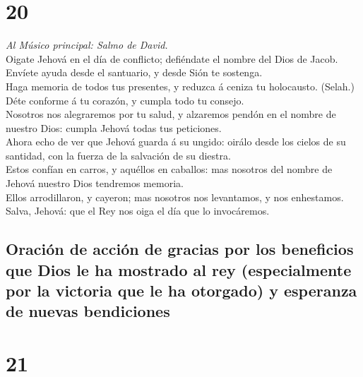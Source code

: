 \hypertarget{section-19}{%
\section{20}\label{section-19}}

 \emph{Al Músico principal: Salmo de David.}\\
Oigate Jehová en el día de conflicto; defiéndate el nombre del Dios de
Jacob.\\
 Envíete ayuda desde el santuario, y desde Sión te
sostenga.\\
 Haga memoria de todos tus presentes, y reduzca á ceniza tu
holocausto. (Selah.)\\
 Déte conforme á tu corazón, y cumpla todo tu consejo.\\
 Nosotros nos alegraremos por tu salud, y alzaremos pendón
en el nombre de nuestro Dios: cumpla Jehová todas tus peticiones.\\
 Ahora echo de ver que Jehová guarda á su ungido: oirálo
desde los cielos de su santidad, con la fuerza de la salvación de su
diestra.\\
 Estos confían en carros, y aquéllos en caballos: mas
nosotros del nombre de Jehová nuestro Dios tendremos memoria.\\
 Ellos arrodillaron, y cayeron; mas nosotros nos levantamos,
y nos enhestamos.\\
 Salva, Jehová: que el Rey nos oiga el día que lo
invocáremos.

\hypertarget{oraciuxf3n-de-acciuxf3n-de-gracias-por-los-beneficios-que-dios-le-ha-mostrado-al-rey-especialmente-por-la-victoria-que-le-ha-otorgado-y-esperanza-de-nuevas-bendiciones}{%
\subsection{Oración de acción de gracias por los beneficios que Dios le
ha mostrado al rey (especialmente por la victoria que le ha otorgado) y
esperanza de nuevas
bendiciones}\label{oraciuxf3n-de-acciuxf3n-de-gracias-por-los-beneficios-que-dios-le-ha-mostrado-al-rey-especialmente-por-la-victoria-que-le-ha-otorgado-y-esperanza-de-nuevas-bendiciones}}

\hypertarget{section-20}{%
\section{21}\label{section-20}}

